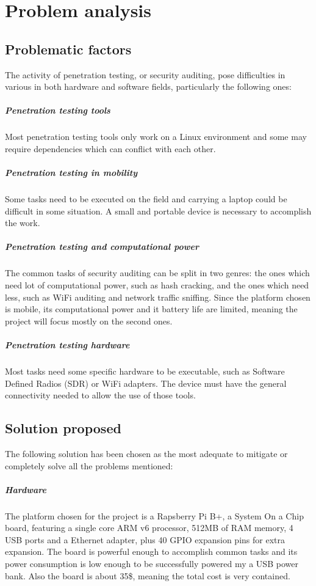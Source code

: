 \documentclass[../PiTest.tex]{subfiles}
\begin{document}
\section{Problem analysis}

    \subsection{Problematic factors}

    The activity of penetration testing, or security auditing, pose difficulties in various in both hardware and software fields, particularly the following ones:

    \subparagraph{Penetration testing tools}
        Most penetration testing tools only work on a Linux environment and some may require dependencies which can conflict with each other.    

	\subparagraph{Penetration testing in mobility}
        Some tasks need to be executed on the field and carrying a laptop could be difficult in some situation.
        A small and portable device is necessary to accomplish the work.

    \subparagraph{Penetration testing and computational power}
        The common tasks of security auditing can be split in two genres: the ones which need lot of computational power, such as hash cracking, and the ones which need less, such as WiFi auditing and network traffic sniffing.
        Since the platform chosen is mobile, its computational power and it battery life are limited, meaning the project will focus mostly on the second ones. 
	
    \subparagraph{Penetration testing hardware}
        Most tasks need some specific hardware to be executable, such as Software Defined Radios (SDR) or WiFi adapters. The device must have the general connectivity needed to allow the use of those tools.


	\subsection{Solution proposed}
        The following solution has been chosen as the most adequate to mitigate or completely solve all the problems mentioned:
        
        \subparagraph{Hardware}
            The platform chosen for the project is a Rapsberry Pi B+, a System On a Chip board, featuring a single core ARM v6 processor, 512MB of RAM memory, 4 USB ports and a Ethernet adapter, plus 40 GPIO expansion pins for extra expansion. The board is powerful enough to accomplish common tasks and its power consumption is low enough to be successfully powered my a USB power bank. Also the board is about 35\$, meaning the total cost is very contained.
        
\end{document}
